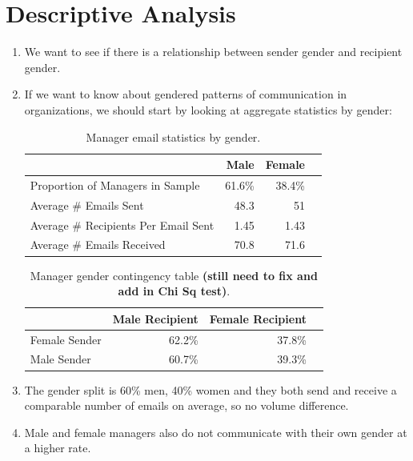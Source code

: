 \documentclass[fleqn]{MJDArticle}
\begin{document}
\section{Descriptive Analysis}
\begin{enumerate}
	
	\item We want to see if there is a relationship between sender gender and recipient gender.
	\item If we want to know about gendered patterns of communication in organizations, we should start by looking at aggregate statistics by gender:
	
	
	\begin{table}[H]
	\centering
		\begin{tabular}{m{2in}rrr}
		\toprule
	& \textbf{Male} & \textbf{Female}  \\
		 \midrule
		 Proportion of Managers in Sample & 61.6\%& 38.4\% \\
		 \midrule
		 Average \# Emails Sent & 48.3 & 51 \\
		 Average \# Recipients Per Email Sent & 1.45 & 1.43 \\
		 \midrule
		 Average \# Emails Received & 70.8 & 71.6 \\
		\bottomrule
		\end{tabular}
		\caption{\label{tab:email agg stats}Manager email statistics by gender.}
	\end{table}
	
	
	\begin{table}[H]
	\centering
		\begin{tabular}{lrrr}
		\toprule
	& \textbf{Male Recipient} & \textbf{Female Recipient}  \\
		 \midrule
		 Female Sender & 62.2\% & 37.8\% \\
		 Male Sender & 60.7\% & 39.3\%  \\
		\bottomrule
		\end{tabular}
		\caption{\label{tab:email agg stats}Manager gender contingency table \textbf{(still need to fix and add in Chi Sq test)}.}
	\end{table}
	
	\item The gender split is 60\% men, 40\% women and they both send and receive a comparable number of emails on average, so no volume difference.
	\item Male and female managers also do not communicate with their own gender at a higher rate. 
	

\end{enumerate}
\end{document}
